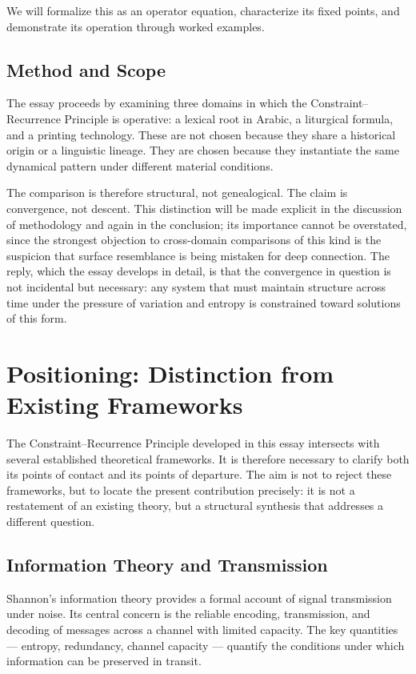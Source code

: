 \documentclass[12pt, oneside]{article}
\theoremstyle{definition}
\theoremstyle{remark}
\begin{document}
We will formalize this as an operator equation, characterize its fixed points, and demonstrate its operation through worked examples.

\subsection{Method and Scope}

The essay proceeds by examining three domains in which the Constraint--Recurrence Principle is operative: a lexical root in Arabic, a liturgical formula, and a printing technology.
These are not chosen because they share a historical origin or a linguistic lineage.
They are chosen because they instantiate the same dynamical pattern under different material conditions.

The comparison is therefore structural, not genealogical.
The claim is convergence, not descent.
This distinction will be made explicit in the discussion of methodology and again in the conclusion; its importance cannot be overstated, since the strongest objection to cross-domain comparisons of this kind is the suspicion that surface resemblance is being mistaken for deep connection.
The reply, which the essay develops in detail, is that the convergence in question is not incidental but necessary: any system that must maintain structure across time under the pressure of variation and entropy is constrained toward solutions of this form.

\section{Positioning: Distinction from Existing Frameworks}

The Constraint--Recurrence Principle developed in this essay intersects with several established theoretical frameworks.
It is therefore necessary to clarify both its points of contact and its points of departure.
The aim is not to reject these frameworks, but to locate the present contribution precisely: it is not a restatement of an existing theory, but a structural synthesis that addresses a different question.

\subsection{Information Theory and Transmission}

Shannon's information theory provides a formal account of signal transmission under noise.
Its central concern is the reliable encoding, transmission, and decoding of messages across a channel with limited capacity.
The key quantities --- entropy, redundancy, channel capacity --- quantify the conditions under which information can be preserved in transit.
\end{document}
